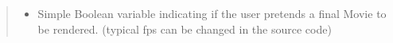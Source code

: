 \documentclass[letterpaper,10pt,english]{sphinxmanual}
\begin{document}
\begin{fulllineitems}
\begin{fulllineitems}
\begin{quote}
\begin{description}
\begin{itemize}
\item {} 
 \textendash{} Simple Boolean variable indicating if the user pretends a final Movie to be rendered. (typical fps can be changed in the source code)

\end{itemize}

\end{description}\end{quote}

\end{fulllineitems}


\end{fulllineitems}




\renewcommand{\indexname}{Index}
\printindex
\end{document}

